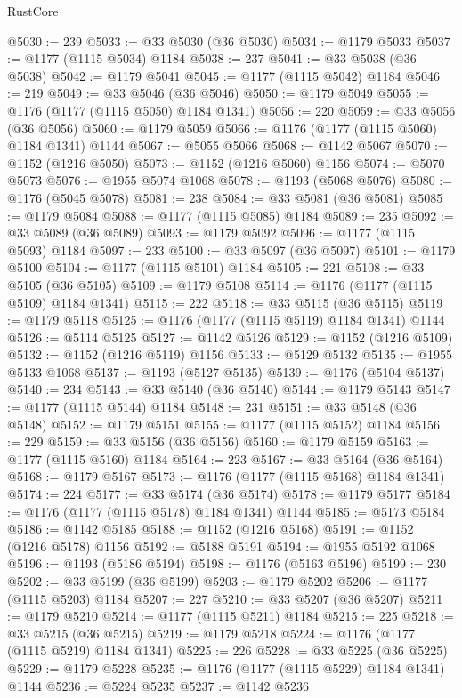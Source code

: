 \begin{lexlean}{RustCore}
\begin{coremodule}
@5030 := 239
@5033 := @33 @5030 (@36 @5030)
@5034 := @1179 @5033
@5037 := @1177 (@1115 @5034) @1184
@5038 := 237
@5041 := @33 @5038 (@36 @5038)
@5042 := @1179 @5041
@5045 := @1177 (@1115 @5042) @1184
@5046 := 219
@5049 := @33 @5046 (@36 @5046)
@5050 := @1179 @5049
@5055 := @1176 (@1177 (@1115 @5050) @1184 @1341)
@5056 := 220
@5059 := @33 @5056 (@36 @5056)
@5060 := @1179 @5059
@5066 := @1176 (@1177 (@1115 @5060) @1184 @1341) @1144
@5067 := @5055 @5066
@5068 := @1142 @5067
@5070 := @1152 (@1216 @5050)
@5073 := @1152 (@1216 @5060) @1156
@5074 := @5070 @5073
@5076 := @1955 @5074 @1068
@5078 := @1193 (@5068 @5076)
@5080 := @1176 (@5045 @5078)
@5081 := 238
@5084 := @33 @5081 (@36 @5081)
@5085 := @1179 @5084
@5088 := @1177 (@1115 @5085) @1184
@5089 := 235
@5092 := @33 @5089 (@36 @5089)
@5093 := @1179 @5092
@5096 := @1177 (@1115 @5093) @1184
@5097 := 233
@5100 := @33 @5097 (@36 @5097)
@5101 := @1179 @5100
@5104 := @1177 (@1115 @5101) @1184
@5105 := 221
@5108 := @33 @5105 (@36 @5105)
@5109 := @1179 @5108
@5114 := @1176 (@1177 (@1115 @5109) @1184 @1341)
@5115 := 222
@5118 := @33 @5115 (@36 @5115)
@5119 := @1179 @5118
@5125 := @1176 (@1177 (@1115 @5119) @1184 @1341) @1144
@5126 := @5114 @5125
@5127 := @1142 @5126
@5129 := @1152 (@1216 @5109)
@5132 := @1152 (@1216 @5119) @1156
@5133 := @5129 @5132
@5135 := @1955 @5133 @1068
@5137 := @1193 (@5127 @5135)
@5139 := @1176 (@5104 @5137)
@5140 := 234
@5143 := @33 @5140 (@36 @5140)
@5144 := @1179 @5143
@5147 := @1177 (@1115 @5144) @1184
@5148 := 231
@5151 := @33 @5148 (@36 @5148)
@5152 := @1179 @5151
@5155 := @1177 (@1115 @5152) @1184
@5156 := 229
@5159 := @33 @5156 (@36 @5156)
@5160 := @1179 @5159
@5163 := @1177 (@1115 @5160) @1184
@5164 := 223
@5167 := @33 @5164 (@36 @5164)
@5168 := @1179 @5167
@5173 := @1176 (@1177 (@1115 @5168) @1184 @1341)
@5174 := 224
@5177 := @33 @5174 (@36 @5174)
@5178 := @1179 @5177
@5184 := @1176 (@1177 (@1115 @5178) @1184 @1341) @1144
@5185 := @5173 @5184
@5186 := @1142 @5185
@5188 := @1152 (@1216 @5168)
@5191 := @1152 (@1216 @5178) @1156
@5192 := @5188 @5191
@5194 := @1955 @5192 @1068
@5196 := @1193 (@5186 @5194)
@5198 := @1176 (@5163 @5196)
@5199 := 230
@5202 := @33 @5199 (@36 @5199)
@5203 := @1179 @5202
@5206 := @1177 (@1115 @5203) @1184
@5207 := 227
@5210 := @33 @5207 (@36 @5207)
@5211 := @1179 @5210
@5214 := @1177 (@1115 @5211) @1184
@5215 := 225
@5218 := @33 @5215 (@36 @5215)
@5219 := @1179 @5218
@5224 := @1176 (@1177 (@1115 @5219) @1184 @1341)
@5225 := 226
@5228 := @33 @5225 (@36 @5225)
@5229 := @1179 @5228
@5235 := @1176 (@1177 (@1115 @5229) @1184 @1341) @1144
@5236 := @5224 @5235
@5237 := @1142 @5236

\end{coremodule}
\end{lexlean}
